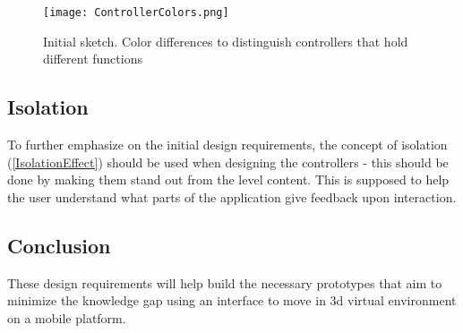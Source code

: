 \begin{figure}[H]
\centering
\texttt{[image: ControllerColors.png]}
\caption{Initial sketch. Color differences to distinguish controllers that hold different functions}
\end{figure}

\subsection{Isolation}
To further emphasize on the initial design requirements, the concept of isolation (\ref{IsolationEffect}) should be used when designing the controllers - this should be done by making them stand out from the level content. This is supposed to help the user understand what parts of the application give feedback upon interaction.

\subsection{Conclusion}
These design requirements will help build the necessary prototypes that aim to minimize the knowledge gap using an interface to move in 3d virtual environment on a mobile platform.
